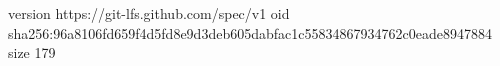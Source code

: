 version https://git-lfs.github.com/spec/v1
oid sha256:96a8106fd659f4d5fd8e9d3deb605dabfac1c55834867934762c0eade8947884
size 179
